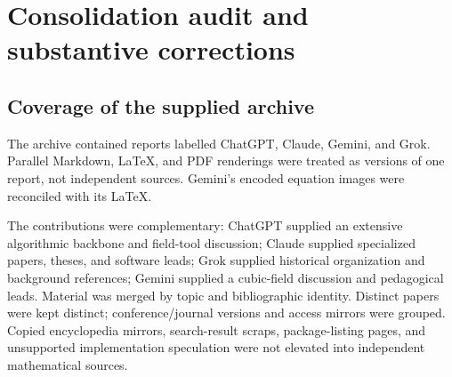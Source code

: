 \documentclass[11pt,a4paper]{article}
\numberwithin{equation}{section}
\theoremstyle{definition}\newtheorem{definition}[theorem]{Definition}
\theoremstyle{remark}\newtheorem{remark}[theorem]{Remark}
\begin{document}
\appendix
\section{Consolidation audit and substantive corrections}
\label{sec:audit}

\subsection{Coverage of the supplied archive}
The archive contained reports labelled ChatGPT, Claude, Gemini, and Grok. Parallel Markdown, LaTeX, and PDF renderings were treated as versions of one report, not independent sources. Gemini's encoded equation images were reconciled with its LaTeX.

The contributions were complementary: ChatGPT supplied an extensive algorithmic backbone and field-tool discussion; Claude supplied specialized papers, theses, and software leads; Grok supplied historical organization and background references; Gemini supplied a cubic-field discussion and pedagogical leads. Material was merged by topic and bibliographic identity. Distinct papers were kept distinct; conference/journal versions and access mirrors were grouped. Copied encyclopedia mirrors, search-result scraps, package-listing pages, and unsupported implementation speculation were not elevated into independent mathematical sources.
\end{document}

